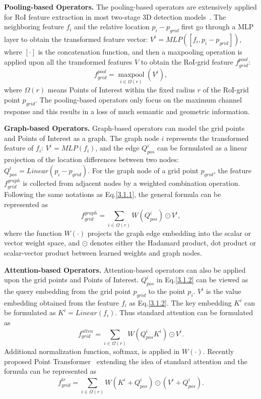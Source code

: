\documentclass[10pt,twocolumn,letterpaper]{article}
\begin{document}
\textbf{Pooling-based Operators.} The pooling-based operators are extensively applied for RoI feature extraction in most two-stage 3D detection models~\cite{shi2020pv, deng2020voxel, shi2021pv}. The neighboring feature $f_{i}$ and the relative location $p_{i} - p_{grid}$ first go through a MLP layer to obtain the transformed feature vector: $V^{i} = MLP([f_{i}, p_{i} - p_{grid}])$, where $[\cdot]$ is the concatenation function, and then a maxpooling operation is applied upon all the transformed features $V$ to obtain the RoI-grid feature $f^{pool}_{grid}$:
\begin{equation} \label{3.1.1}
    f^{pool}_{grid} = \mathop{maxpool}\limits_{i \in \Omega(r)}(V^{i}),
\end{equation} 
where $\Omega(r)$ means Points of Interest within the fixed radius $r$ of the RoI-grid point $p_{grid}$. The pooling-based operators only focus on the maximum channel response and this results in a loss of much semantic and geometric information.

\textbf{Graph-based Operators.} Graph-based operators can model the grid points and Points of Interest as a graph. The graph node $i$ represents the transformed feature of $f_{i}$: $V^{i} = MLP(f_{i})$, and the edge $Q^{i}_{pos}$ can be formulated as a linear projection of the location differences between two nodes: $Q^{i}_{pos} = Linear(p_{i} - p_{grid})$. For the graph node of a grid point $p_{grid}$, the feature $f^{graph}_{grid}$ is collected from adjacent nodes by a weighted combination operation. Following the same notations as Eq.\ref{3.1.1}, the general formula can be represented as
\begin{equation} \label{3.1.2}
    f^{graph}_{grid} = \sum_{i \in \Omega(r)}W(Q^{i}_{pos})\odot V^{i},
\end{equation}
where the function $W(\cdot)$ projects the graph edge embedding into the scalar or vector weight space, and $\odot$ denotes either the Hadamard product, dot product or scalar-vector product between learned weights and graph nodes.

\textbf{Attention-based Operators.} Attention-based operators can also be applied upon the grid points and Points of Interest. $Q^{i}_{pos}$ in Eq.\ref{3.1.2} can be viewed as the query embedding from the grid point $p_{grid}$ to the point $p_{i}$. $V^{i}$ is the value embedding obtained from the feature $f_{i}$ as Eq.\ref{3.1.2}. The key embedding $K^{i}$ can be formulated as $K^{i} = Linear(f_{i})$. Thus standard attention can be formulated as
\begin{equation} \label{3.1.3}
    f^{atten}_{grid} = \sum_{i \in \Omega(r)}W(Q^{i}_{pos}K^{i})\odot V^{i}.
\end{equation}
Additional normalization function, \ie softmax, is applied in $W(\cdot)$. Recently proposed Point Transformer~\cite{zhao2020point} extending the idea of standard attention and the formula can be represented as
\begin{equation} \label{3.1.4}
    f^{tr}_{grid} = \sum_{i \in \Omega(r)}W(K^{i} + Q^{i}_{pos})\odot (V^{i} + Q^{i}_{pos}).
\end{equation}
\end{document}
